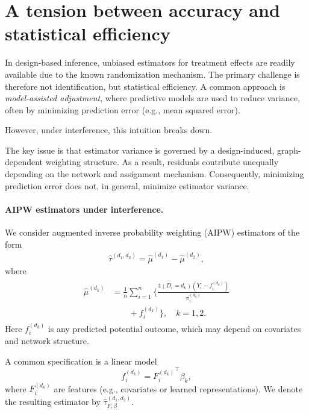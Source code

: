 \documentclass[twoside,letterpaper]{article}
\newcommand{\mathbbm}[1]{\mathds{#1}}
\theoremstyle{plain}
\theoremstyle{definition}
\theoremstyle{remark}
\newcommand{\indicator}{\mathbbm{1}}
\begin{document}

\section{A tension between accuracy and statistical efficiency}
\label{sec::model_assisted_adjustment} 

In design-based inference, unbiased estimators for treatment effects are readily available due to the known randomization mechanism. The primary challenge is therefore not identification, but statistical efficiency. A common approach is \emph{model-assisted adjustment}, where predictive models are used to reduce variance, often by minimizing prediction error (e.g., mean squared error).

However, under interference, this intuition breaks down.

The key issue is that estimator variance is governed by a design-induced, graph-dependent weighting structure. As a result, residuals contribute unequally depending on the network and assignment mechanism. Consequently, minimizing prediction error does not, in general, minimize estimator variance.

\paragraph{AIPW estimators under interference.}
We consider augmented inverse probability weighting (AIPW) estimators of the form
\begin{align}\label{eq::aipw_def}
\hat\tau^{(d_1,d_2)} = \hat{\mu}^{(d_1)} - \hat{\mu}^{(d_2)},
\end{align}
where
\begin{align}
    \begin{aligned}
    \hat{\mu}^{(d_k)} &= \frac{1}{n}\sum_{i=1}^n \biggl\{
    \frac{\indicator(D_i=d_k)(Y_i-f_i^{(d_k)})}{\pi_i^{(d_k)}} \\
    &\qquad + f_i^{(d_k)} \biggr\}, \quad k=1,2.
    \end{aligned}
\end{align}
Here $f_i^{(d_k)}$ is any predicted potential outcome, which may depend on covariates and network structure.

A common specification is a linear model
\[
f_i^{(d_k)} = {F_i^{(d_k)}}^\top \beta_k,
\]
where $F_i^{(d_k)}$ are features (e.g., covariates or learned representations). We denote the resulting estimator by $\hat\tau^{(d_1,d_2)}_{F,\beta}$.
\end{document}
